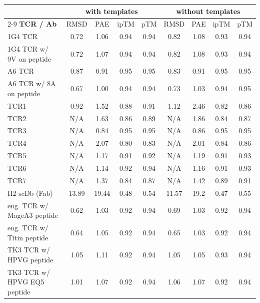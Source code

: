 \begin{table}[ht]
\centering
\begin{tabular}{l c c c c c c c c}
 & \multicolumn{4}{c}{with templates} & \multicolumn{4}{c}{without templates} \\
 \cline{2-9}
\textbf{TCR / Ab} & RMSD & PAE & ipTM & pTM & RMSD & PAE & ipTM & pTM \\
\hline \hline
1G4 TCR & 0.72 & 1.06 & 0.94 & 0.94 & 0.82 & 1.08 & 0.93 & 0.94 \\
1G4 TCR w/ 9V on peptide & 0.72 & 1.07 & 0.94 & 0.94 & 0.82 & 1.08 & 0.93 & 0.94 \\
A6 TCR & 0.87 & 0.91 & 0.95 & 0.95 & 0.83 & 0.91 & 0.95 & 0.95 \\
A6 TCR w/ 8A on peptide & 0.67 & 1.00 & 0.94 & 0.94 & 0.73 & 1.03 & 0.94 & 0.95 \\
\hline
TCR1 & 0.92 & 1.52 & 0.88 & 0.91 & 1.12 & 2.46 & 0.82 & 0.86 \\
TCR2 & N/A & 1.63 & 0.86 & 0.89 & N/A & 1.86 & 0.84 & 0.87 \\
TCR3 & N/A & 0.84 & 0.95 & 0.95 & N/A & 0.86 & 0.95 & 0.95 \\
TCR4 & N/A & 2.07 & 0.80 & 0.83 & N/A & 2.01 & 0.84 & 0.86 \\
TCR5 & N/A & 1.17 & 0.91 & 0.92 & N/A & 1.19 & 0.91 & 0.93 \\
TCR6 & N/A & 1.14 & 0.92 & 0.94 & N/A & 1.16 & 0.91 & 0.93 \\
TCR7 & N/A & 1.37 & 0.84 & 0.87 & N/A & 1.42 & 0.89 & 0.91 \\
H2-scDb (Fab) & 13.89 & 19.44 & 0.48 & 0.54 & 11.57 & 19.2 & 0.47 & 0.55 \\
\hline
eng. TCR w/ MageA3 peptide & 0.62 & 1.03 & 0.92 & 0.94 & 0.69 & 1.03 & 0.92 & 0.94 \\
eng. TCR w/ Titin peptide & 0.64 & 1.05 & 0.92 & 0.94 & 0.65 & 1.03 & 0.92 & 0.94 \\
TK3 TCR w/ HPVG peptide & 1.05 & 1.11 & 0.92 & 0.94 & 1.05 & 1.05 & 0.93 & 0.94 \\
TK3 TCR w/ HPVG EQ5 peptide & 1.01 & 1.07 & 0.92 & 0.94 & 1.06 & 1.07 & 0.92 & 0.94 \\
\hline
\end{tabular}
\end{table}
